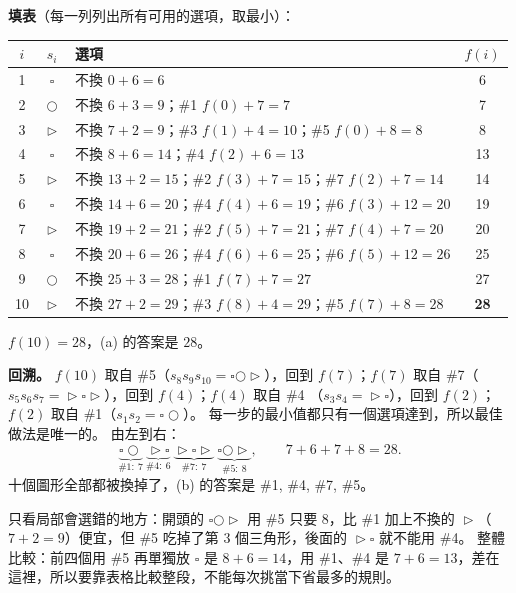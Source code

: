 \begin{pastsoln}
\textbf{填表}（每一列列出所有可用的選項，取最小）：
\begin{center}
\small
\begin{tabular}{cclc}
\toprule
$i$ & $s_i$ & 選項 & $f(i)$ \\
\midrule
1 & $\square$ & 不換 $0 + 6 = 6$ & 6 \\
2 & $\bigcirc$ & 不換 $6 + 3 = 9$；\#1 $f(0) + 7 = 7$ & 7 \\
3 & $\vartriangleright$ & 不換 $7 + 2 = 9$；\#3 $f(1) + 4 = 10$；\#5 $f(0) + 8 = 8$ & 8 \\
4 & $\square$ & 不換 $8 + 6 = 14$；\#4 $f(2) + 6 = 13$ & 13 \\
5 & $\vartriangleright$ & 不換 $13 + 2 = 15$；\#2 $f(3) + 7 = 15$；\#7 $f(2) + 7 = 14$ & 14 \\
6 & $\square$ & 不換 $14 + 6 = 20$；\#4 $f(4) + 6 = 19$；\#6 $f(3) + 12 = 20$ & 19 \\
7 & $\vartriangleright$ & 不換 $19 + 2 = 21$；\#2 $f(5) + 7 = 21$；\#7 $f(4) + 7 = 20$ & 20 \\
8 & $\square$ & 不換 $20 + 6 = 26$；\#4 $f(6) + 6 = 25$；\#6 $f(5) + 12 = 26$ & 25 \\
9 & $\bigcirc$ & 不換 $25 + 3 = 28$；\#1 $f(7) + 7 = 27$ & 27 \\
10 & $\vartriangleright$ & 不換 $27 + 2 = 29$；\#3 $f(8) + 4 = 29$；\#5 $f(7) + 8 = 28$ & \textbf{28} \\
\bottomrule
\end{tabular}
\end{center}
$f(10) = 28$，(a) 的答案是 $28$。

\textbf{回溯。} $f(10)$ 取自 \#5（$s_8 s_9 s_{10} = \square\bigcirc\vartriangleright$），回到 $f(7)$；$f(7)$
取自 \#7（$s_5 s_6 s_7 = \vartriangleright\square\vartriangleright$），回到 $f(4)$；$f(4)$ 取自 \#4
（$s_3 s_4 = \vartriangleright\square$），回到 $f(2)$；$f(2)$ 取自 \#1（$s_1 s_2 = \square\bigcirc$）。
每一步的最小值都只有一個選項達到，所以最佳做法是唯一的。 由左到右：
\[
\underbrace{\square\bigcirc}_{\#1:\ 7}\
\underbrace{\vartriangleright\square}_{\#4:\ 6}\
\underbrace{\vartriangleright\square\vartriangleright}_{\#7:\ 7}\
\underbrace{\square\bigcirc\vartriangleright}_{\#5:\ 8},
\qquad 7 + 6 + 7 + 8 = 28.
\]
十個圖形全部都被換掉了，(b) 的答案是 \#1, \#4, \#7, \#5。

只看局部會選錯的地方：開頭的 $\square\bigcirc\vartriangleright$ 用 \#5 只要 $8$，比 \#1 加上不換的
$\vartriangleright$（$7 + 2 = 9$）便宜，但 \#5 吃掉了第 $3$ 個三角形，後面的 $\vartriangleright\square$
就不能用 \#4。 整體比較：前四個用 \#5 再單獨放 $\square$ 是 $8 + 6 = 14$，用 \#1、\#4 是
$7 + 6 = 13$，差在這裡，所以要靠表格比較整段，不能每次挑當下省最多的規則。
\end{pastsoln}
